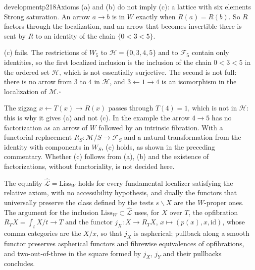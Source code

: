 \begin{dcomment}{development}{p218}{Axioms (a) and (b) do not imply (c): a lattice with six elements}
Strong saturation. An arrow $a\to b$ is in $W$ exactly when $R(a)=R(b)$. So $R$ factors through the localization, and an arrow that becomes invertible there is sent by $R$ to an identity of the chain $\{0<3<5\}$.

(c) fails. The restrictions of $W_5$ to $\mathcal H=\{0,3,4,5\}$ and to $\mathcal F_5$ contain only identities, so the first localized inclusion is the inclusion of the chain $0<3<5$ in the ordered set $\mathcal H$, which is not essentially surjective. The second is not full: there is no arrow from $3$ to $4$ in $\mathcal H$, and $3\leftarrow1\to4$ is an isomorphism in the localization of $\mathcal M$.\hfill$\square$

The zigzag $x\leftarrow T(x)\to R(x)$ passes through $T(4)=1$, which is not in $\mathcal H$: this is why it gives (a) and not (c). In the example the arrow $4\to5$ has no factorization as an arrow of $W$ followed by an intrinsic fibration. With a functorial replacement $R_S:\mathcal M/S\to\mathcal F_S$ and a natural transformation from the identity with components in $W_S$, (c) holds, as shown in the preceding commentary. Whether (c) follows from (a), (b) and the existence of factorizations, without functoriality, is not decided here.
\end{dcomment}

The equality $\widehat{\mathcal L}=\mathrm{Liss}_W$ holds for every fundamental localizer satisfying the relative axiom, with no accessibility hypothesis, and dually the functors that universally preserve the class defined by the tests $s\backslash X$ are the $W$-proper ones. The argument for the inclusion $\mathrm{Liss}_W\subset\widehat{\mathcal L}$ uses, for $X$ over $T$, the opfibration $R_TX=\int_{t}X/t\to T$ and the functor $j_X:X\to R_TX$, $x\mapsto(p(x),x,\mathrm{id})$, whose comma categories are the $X/x$, so that $j_X$ is aspherical; pullback along a smooth functor preserves aspherical functors and fibrewise equivalences of opfibrations, and two-out-of-three in the square formed by $j_X$, $j_Y$ and their pullbacks concludes.

